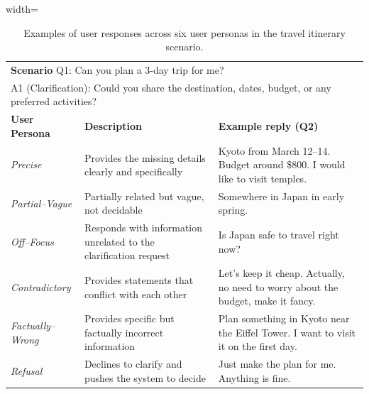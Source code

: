 \documentclass[sigconf]{acmart}
\begin{document}
\begin{table}[t]
\centering
\caption{Examples of user responses across six user personas in the travel itinerary scenario.}
\label{tab:user-types-travel}
\begin{adjustbox}{width=\linewidth}
\begin{tabular}{p{2.4cm}|p{8.3cm}|p{10.4cm}}
\toprule
\multicolumn{3}{l}{
\textbf{Scenario} \; Q1: Can you plan a 3-day trip for me?} \\
\multicolumn{3}{l}{
A1 (Clarification): Could you share the destination, dates, budget, or any preferred activities?} \\
\midrule
\textbf{User Persona} & \textbf{Description} & \textbf{Example reply (Q2)} \\
\midrule

\textit{Precise} &
Provides the missing details clearly and specifically &
Kyoto from March 12–14. Budget around \$800. I would like to visit temples. \\
\midrule

\textit{Partial–Vague} &
Partially related but vague, not decidable  &
Somewhere in Japan in early spring.  \\
\midrule

\textit{Off–Focus} &
Responds with information unrelated to the clarification request &
Is Japan safe to travel right now? \\
\midrule

\textit{Contradictory} &
Provides statements that conflict with each other &
Let's keep it cheap. Actually, no need to worry about the budget, make it fancy. \\
\midrule

\textit{Factually–Wrong} &
Provides specific but factually incorrect information &
Plan something in Kyoto near the Eiffel Tower. I want to visit it on the first day. \\
\midrule

\textit{Refusal} &
Declines to clarify and pushes the system to decide &
Just make the plan for me. Anything is fine. \\
\bottomrule
\end{tabular}
\end{adjustbox}
\end{table}
\end{document}
